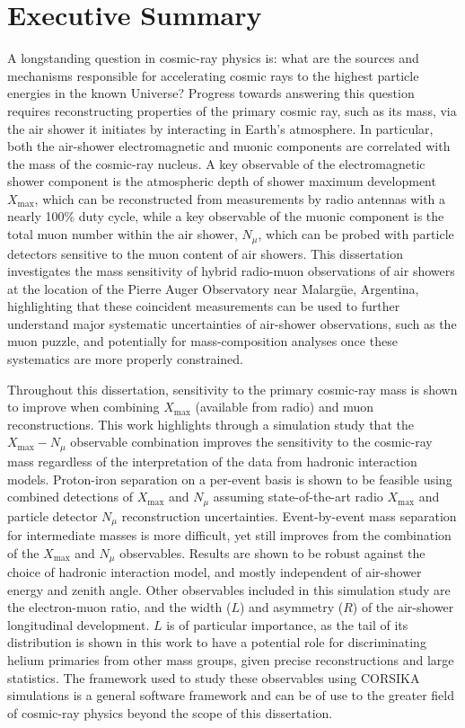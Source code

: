 %
%
\chapter{Executive Summary}\label{chap:summary}

A longstanding question in cosmic-ray physics is: what are the sources and mechanisms responsible for accelerating cosmic rays to the highest particle energies in the known Universe?
Progress towards answering this question requires reconstructing properties of the primary cosmic ray, such as its mass, via the air shower it initiates by interacting in Earth's atmosphere.
In particular, both the air-shower electromagnetic and muonic components are correlated with the mass of the cosmic-ray nucleus.
A key observable of the electromagnetic shower component is the atmospheric depth of shower maximum development $X_{\text{max}}$, which can be reconstructed from measurements by radio antennas with a nearly 100\% duty cycle, while a key observable of the muonic component is the total muon number within the air shower, $N_{\mu}$, which can be probed with particle detectors sensitive to the muon content of air showers.
This dissertation investigates the mass sensitivity of hybrid radio-muon observations of air showers at the location of the Pierre Auger Observatory near Malarg\"{u}e, Argentina, highlighting that these coincident measurements can be used to further understand major systematic uncertainties of air-shower observations, such as the muon puzzle, and potentially for mass-composition analyses once these systematics are more properly constrained.

Throughout this dissertation, sensitivity to the primary cosmic-ray mass is shown to improve when combining $X_{\text{max}}$ (available from radio) and muon reconstructions.
This work highlights through a simulation study that the $X_{\text{max}}-N_{\mu}$ observable combination improves the sensitivity to the cosmic-ray mass regardless of the interpretation of the data from hadronic interaction models.
Proton-iron separation on a per-event basis is shown to be feasible using combined detections of $X_{\text{max}}$ and $N_{\mu}$ assuming state-of-the-art radio $X_{\text{max}}$ and particle detector $N_{\mu}$ reconstruction uncertainties.
Event-by-event mass separation for intermediate masses is more difficult, yet still improves from the combination of the $X_{\text{max}}$ and $N_{\mu}$ observables.
Results are shown to be robust against the choice of hadronic interaction model, and mostly independent of air-shower energy and zenith angle.
Other observables included in this simulation study are the electron-muon ratio, and the width ($L$) and asymmetry ($R$) of the air-shower longitudinal development.
$L$ is of particular importance, as the tail of its distribution is shown in this work to have a potential role for discriminating helium primaries from other mass groups, given precise reconstructions and large statistics. 
The framework used to study these observables using CORSIKA simulations is a general software framework and can be of use to the greater field of cosmic-ray physics beyond the scope of this dissertation.

